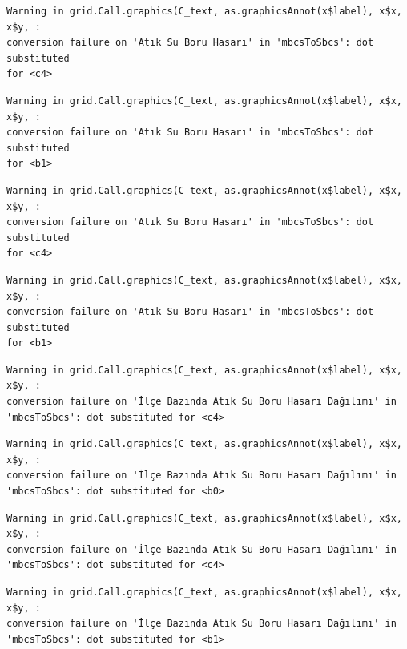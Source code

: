 \documentclass[
  11pt,
  a4paper,
  DIV=11,
  numbers=noendperiod]{scrartcl}
\begin{document}
\begin{verbatim}
Warning in grid.Call.graphics(C_text, as.graphicsAnnot(x$label), x$x, x$y, :
conversion failure on 'Atık Su Boru Hasarı' in 'mbcsToSbcs': dot substituted
for <c4>
\end{verbatim}

\begin{verbatim}
Warning in grid.Call.graphics(C_text, as.graphicsAnnot(x$label), x$x, x$y, :
conversion failure on 'Atık Su Boru Hasarı' in 'mbcsToSbcs': dot substituted
for <b1>
\end{verbatim}

\begin{verbatim}
Warning in grid.Call.graphics(C_text, as.graphicsAnnot(x$label), x$x, x$y, :
conversion failure on 'Atık Su Boru Hasarı' in 'mbcsToSbcs': dot substituted
for <c4>
\end{verbatim}

\begin{verbatim}
Warning in grid.Call.graphics(C_text, as.graphicsAnnot(x$label), x$x, x$y, :
conversion failure on 'Atık Su Boru Hasarı' in 'mbcsToSbcs': dot substituted
for <b1>
\end{verbatim}

\begin{verbatim}
Warning in grid.Call.graphics(C_text, as.graphicsAnnot(x$label), x$x, x$y, :
conversion failure on 'İlçe Bazında Atık Su Boru Hasarı Dağılımı' in
'mbcsToSbcs': dot substituted for <c4>
\end{verbatim}

\begin{verbatim}
Warning in grid.Call.graphics(C_text, as.graphicsAnnot(x$label), x$x, x$y, :
conversion failure on 'İlçe Bazında Atık Su Boru Hasarı Dağılımı' in
'mbcsToSbcs': dot substituted for <b0>
\end{verbatim}

\begin{verbatim}
Warning in grid.Call.graphics(C_text, as.graphicsAnnot(x$label), x$x, x$y, :
conversion failure on 'İlçe Bazında Atık Su Boru Hasarı Dağılımı' in
'mbcsToSbcs': dot substituted for <c4>
\end{verbatim}

\begin{verbatim}
Warning in grid.Call.graphics(C_text, as.graphicsAnnot(x$label), x$x, x$y, :
conversion failure on 'İlçe Bazında Atık Su Boru Hasarı Dağılımı' in
'mbcsToSbcs': dot substituted for <b1>
\end{verbatim}
\end{document}
